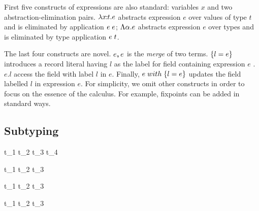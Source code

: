 First five constructs of expressions are also standard: variables $ x $ and two
abstraction-elimination pairs. $ \lambda x \!\!:\!\! t. e $ abstracts expression
$ e $ over values of type $ t $ and is eliminated by application $ e \; e $;
$ \Lambda \alpha. e $ abstracts expression $ e $ over types and is eliminated by
type application $ e \; t $.

The last four constructs are novel. $ e ,\!\!, e $ is the \emph{merge} of two
terms. $ \{ l = e \} $ introduces a record literal having $ l $ as the
label for field containing expression $ e $ . $ e.l $ access the field with
label $ l $ in $ e $. Finally, $ e \; with \; \{ l = e \} $ updates the field
labelled $ l $ in expression $ e $. For simplicity, we omit other constructs in
order to focus on the essence of the calculus. For example, fixpoints can be
added in standard ways.




\subsection{Subtyping}


\infax[S-Var]
{\alpha \subtype \alpha}

{t_1 \to t_2 \subtype t_3 \to t_4}

{ \subtype {}}

{t_1 \with t_2 \subtype t_3}

{t_1 \with t_2 \subtype t_3}

{t_1 \subtype t_2 \with t_3}

{ \subtype {}}

